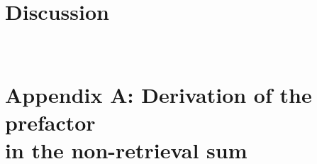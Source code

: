 \documentclass[letterpaper]{article} %
\begin{document}

\section{Discussion}
\label{sec:discussion}











\newpage
~

\newpage

\appendix

\section{Appendix A: Derivation of the prefactor \\in the non-retrieval sum}

\label{app:prefactor}
\end{document}
